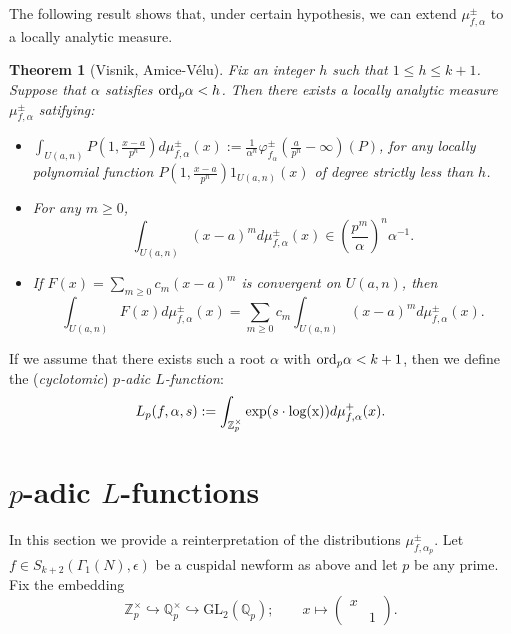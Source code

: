 \documentclass{amsart}
\newtheorem{thm0}[defn0]{Theorem}
\newenvironment{theorem}{\begin{thm0}}{\end{thm0}}
\newcommand{\GL}{{\mathrm{GL}}}
\newcommand{\Z}{{\mathbb Z}}
\newcommand{\Q}{{\mathbb Q}}
\begin{document}
The following result shows that, under certain hypothesis, we can extend $\mu^\pm_{f,\alpha}$ to a locally analytic measure.
\begin{theorem}[Visnik, Amice-V\'elu]\label{ThmVAV}
Fix an integer $h$ such that $1\leq h\leq k+1$. Suppose that %
 $\alpha$ satisfies ${\rm ord}_p\alpha<h$. Then there exists a locally analytic measure $\mu_{f,\alpha}^\pm$ satifying:
\begin{itemize}
\item $\int_{U(a,n)}P\left(1,\frac{x-a}{p^n}\right)d\mu^\pm_{f,\alpha}(x):=\frac{1}{\alpha^n}\varphi^\pm_{f_{\alpha}}\left(\frac{a}{p^n}-\infty\right)(P)$, for any locally polynomial function $P\left(1,\frac{x-a}{p^n}\right)1_{U(a,n)}(x)$ of degree strictly less than $h$.

\item For any $m\geq 0$,
\[
\int_{U(a,n)}(x-a)^md\mu^\pm_{f,\alpha}(x)\in \left(\frac{p^m}{\alpha}\right)^n\alpha^{-1}.
\]

\item If $F(x)=\sum_{m\geq 0}c_m(x-a)^m$ is convergent on $U(a,n)$, then
\[
\int_{U(a,n)}F(x)d\mu^\pm_{f,\alpha}(x)=\sum_{m\geq 0}c_m\int_{U(a,n)}(x-a)^md\mu^\pm_{f,\alpha}(x).
\]
\end{itemize}
\end{theorem}
If we assume that there exists such a root $\alpha$ with ${\rm ord}_p\alpha<k+1$, then we define the (\emph{cyclotomic}) \emph{$p$-adic $L$-function}:
\[
L_p(f,\alpha,s):=\int_{\Z_p^\times}{\rm exp}(s\cdot{\rm log(x)})d\mu_{f,\alpha}^+(x).
\]







\section{$p$-adic $L$-functions}\label{padicLfunct}

In this section we provide a reinterpretation of the distributions $\mu^\pm_{f,\alpha_p}$. 
Let $f\in S_{k+2}(\Gamma_1(N),\epsilon)$ be a cuspidal newform as above and let $p$ be any prime. Fix the embedding
\begin{equation}\label{actQ_p}
\Z_p^\times\hookrightarrow\Q_p^\times\hookrightarrow\GL_2(\Q_p);\qquad x\longmapsto\left(\begin{array}{cc}x&\\&1\end{array}\right).
\end{equation}
\end{document}
